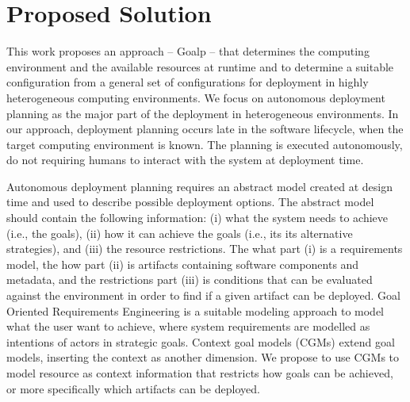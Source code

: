 





\section{Proposed Solution}

This work proposes an approach – Goalp – that determines the computing environment and the available resources at runtime and to determine a suitable configuration from a general set of configurations for deployment in highly heterogeneous computing environments. We focus on autonomous deployment planning as the major part of the deployment in heterogeneous environments. In our approach, deployment planning occurs late in the software lifecycle, when the target computing environment is known. The planning is executed autonomously, do not requiring humans to interact with the system at deployment time.

Autonomous deployment planning requires an abstract model created at design time and used to describe possible deployment options.
The abstract model should contain the following information:
(i) what the system needs to achieve (i.e., the goals), (ii) how it can achieve the goals (i.e., its its alternative strategies), and (iii) the resource restrictions.
The what part (i) is a requirements model, the how part (ii) is artifacts containing software components and metadata, and the restrictions part (iii) is conditions that can be evaluated against the environment in order to find if a given artifact can be deployed.
Goal Oriented Requirements Engineering is a suitable modeling approach to model what the user want to achieve, where system requirements are modelled as intentions of actors in strategic goals\cite{yu_modelling_1996}\cite{bresciani_tropos:_2004}\cite{dardenne_goal-directed_1993}. Context goal models (CGMs) extend goal models\cite{ali_goal-based_2010}, inserting the context as another dimension. We propose to use CGMs to model resource as context information that restricts how goals can be achieved, or more specifically which artifacts can be deployed.



